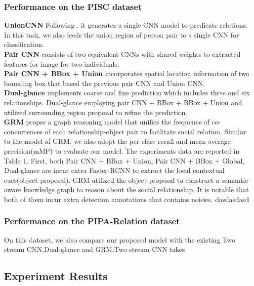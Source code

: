 \documentclass{article}
\begin{document}
\subsubsection{Performance on the PISC dataset}
{\bf UnionCNN}  Following \cite{DBLP:conf/eccv/LuKBL16}, it generates a single CNN model to predicate relations. In this task, we also feeds the union region of person pair to s single CNN for classification.\\
{\bf Pair CNN}\cite{DBLP:conf/iccv/LiWZK17} consists of two equivalent CNNs with shared weights to extracted features for image for two individuals.\\
{\bf Pair CNN + BBox + Union}\cite{DBLP:conf/iccv/LiWZK17} incorporates spatial location information of two bounding box that based the previous pair CNN and Union CNN.\\
{\bf Dual-glance}\cite{DBLP:conf/iccv/LiWZK17} implements coarse and fine prediction which includes three and six relationships. Dual-glance employing pair CNN + BBox + BBox + Union and utilized surrounding region proposal to refine the prediction.\\
{\bf GRM}\cite{DBLP:conf/ijcai/WangCRYCL18} propse a graph reasoning model that unifies the frequence of co-concurrences of each relationship-object pair to facilitate social relation.
Similar to the model of GRM, we also adopt the per-class recall and mean average precision(mMP) to evaluate our model. The experiments data are reported in Table 1. First, both Pair CNN + BBox + Union, Pair CNN + BBox + Global, Dual-glance are incur extra Faster-RCNN\cite{DBLP:conf/nips/RenHGS15} to extract the local contextual cues(object proposal). GRM utilized the object proposal to construct a semantic-aware  knowledge graph to reason about the social relationship. It is notable that both of them incur extra detection annotations that contains noisies. dasdasdasd

\subsubsection{Performance on the PIPA-Relation dataset}
On this dataset, we also compare our proposed model with the existing Two stream CNN\cite{DBLP:conf/cvpr/SunSF17},Dual-glance\cite{DBLP:conf/iccv/LiWZK17} and GRM\cite{DBLP:conf/ijcai/WangCRYCL18}.Two stream CNN takes 

\subsection{Experiment Results}
\end{document}

